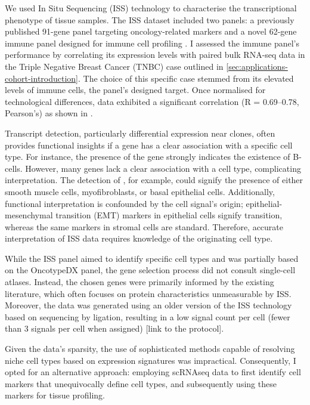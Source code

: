 We used In Situ Sequencing (\ac{ISS}) technology to characterise the transcriptional phenotype of tissue samples. The \ac{ISS} dataset included two panels: a previously published 91-gene panel targeting oncology-related markers and a novel 62-gene immune panel designed for immune cell profiling . I assessed the immune panel's performance by correlating its expression levels with paired bulk RNA-seq data in the Triple Negative Breast Cancer (TNBC) case outlined in \cref{sec:applications-cohort-introduction}. The choice of this specific case stemmed from its elevated levels of immune cells, the panel's designed target. Once normalised for technological differences, data exhibited a significant correlation (R = 0.69–0.78, Pearson's) as shown in .

Transcript detection, particularly differential expression near clones, often provides functional insights if a gene has a clear association with a specific cell type. For instance, the presence of the  gene strongly indicates the existence of B-cells. However, many genes lack a clear association with a cell type, complicating interpretation. The detection of , for example, could signify the presence of either smooth muscle cells, myofibroblasts, or basal epithelial cells. Additionally, functional interpretation is confounded by the cell signal's origin; epithelial-mesenchymal transition (EMT) markers in epithelial cells signify transition, whereas the same markers in stromal cells are standard. Therefore, accurate interpretation of \ac{ISS} data requires knowledge of the originating cell type.

While the \ac{ISS} panel aimed to identify specific cell types and was partially based on the OncotypeDX panel, the gene selection process did not consult single-cell atlases. Instead, the chosen genes were primarily informed by the existing literature, which often focuses on protein characteristics unmeasurable by \ac{ISS}. Moreover, the data was generated using an older version of the \ac{ISS} technology based on sequencing by ligation, resulting in a low signal count per cell (fewer than 3 signals per cell when assigned) [link to the protocol].

Given the data's sparsity, the use of sophisticated methods capable of resolving niche cell types based on expression signatures was impractical. Consequently, I opted for an alternative approach: employing \ac{scRNAseq} data to first identify cell markers that unequivocally define cell types, and subsequently using these markers for tissue profiling.

